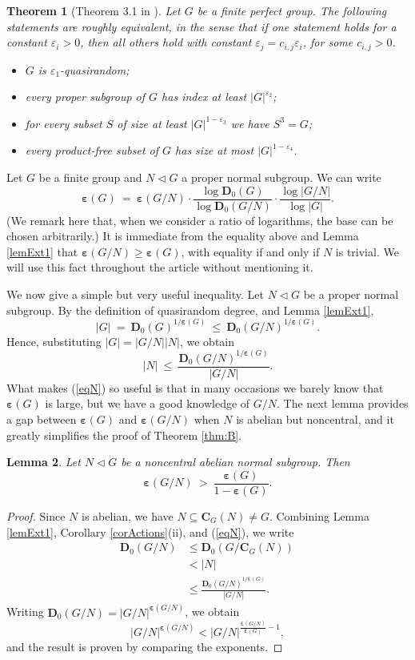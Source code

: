 \documentclass{daj}
\newtheorem{theorem}{Theorem}[section]
\newtheorem{lemma}[theorem]{Lemma}
\theoremstyle{definition}
\theoremstyle{remark}
\newcommand{\C}{\mathbf{C}}
\newcommand{\D}{\mathbf{D}}
\renewcommand{\a}{\boldsymbol{\varepsilon}}
\begin{document}
\begin{theorem}[Theorem 3.1 in \cite{NP11}] \label{thChar}
Let $G$ be a finite perfect group.
The following statements are roughly equivalent,
in the sense that if one statement holds for a constant $\varepsilon_i>0$,
then all others hold with constant $\varepsilon_j=c_{i,j} \varepsilon_i$, for some $c_{i,j}>0$.
\begin{itemize}
\item $G$ is $\varepsilon_1$-quasirandom;
\item every proper subgroup of $G$ has index at least $|G|^{\varepsilon_2}$;
\item for every subset $S$ of size at least $|G|^{1-\varepsilon_3}$ we have $S^3=G$;
\item every product-free subset of $G$ has size at most $|G|^{1-\varepsilon_4}$.
\end{itemize}
\end{theorem}

Let $G$ be a finite group and $N \lhd G$ a proper normal subgroup. We can write
$$ \a(G) \> = \> \a(G/N) \cdot \frac{\log \D_0(G)}{\log \D_0(G/N)} \cdot \frac{\log|G/N|}{\log|G|} . $$
(We remark here that, when we consider a ratio of logarithms, the base can be chosen arbitrarily.)
It is immediate from the equality above and Lemma \ref{lemExt1} that $\a(G/N) \geq \a(G)$, with equality if and only if $N$ is trivial.
We will use this fact throughout the article without mentioning it.

We now give a simple but very useful inequality.
Let $N \lhd G$ be a proper normal subgroup. 
By the definition of quasirandom degree, and Lemma \ref{lemExt1},
$$ |G| \> = \> \D_0(G)^{1/\a(G)} \> \leq \> \D_0(G/N)^{1/\a(G)} . $$
Hence, substituting $|G|=|G/N||N|$, we obtain
\begin{equation}
\label{eqN}
	|N| \> \leq \> \frac{\D_0(G/N)^{1/\a(G)}}{|G/N|} .
\end{equation} 
What makes (\ref{eqN}) so useful is that in many occasions we barely know that $\a(G)$ is large, but we have a good knowledge of $G/N$.
The next lemma provides a gap between $\a(G)$ and $\a(G/N)$ when $N$ is abelian but noncentral,
and it greatly simplifies the proof of Theorem \ref{thm:B}.

\begin{lemma} \label{lemImprove}
	Let $N \lhd G$ be a noncentral abelian normal subgroup.
	Then
	$$ \a(G/N) \> > \> \frac{\a(G)}{1-\a(G)} . $$
\end{lemma}
\begin{proof}
	Since $N$ is abelian, we have $N \subseteq \C_G(N) \neq G$.
	Combining Lemma \ref{lemExt1}, Corollary \ref{corActions}(ii), and (\ref{eqN}), we write
	\[\begin{split}
		\D_0(G/N) 
		&\leq \D_0(G/\C_G(N))
		\\&< |N|
		\\&\leq \frac{\D_0(G/N)^{1/\a(G)}}{|G/N|} . 
	\end{split} \, \] 
	Writing $\D_0(G/N)=|G/N|^{\a(G/N)}$, we obtain
	$$ |G/N|^{\a(G/N)} < |G/N|^{\frac{\a(G/N)}{\a(G)}-1} , $$ 
	and the result is proven by comparing the exponents. 
\end{proof}  
\end{document}
